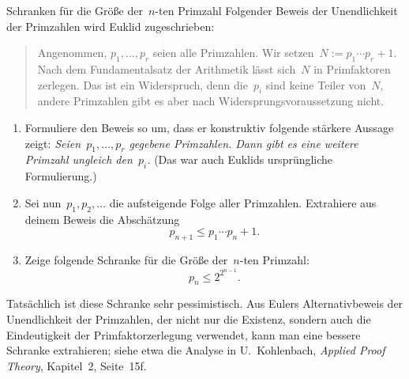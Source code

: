 \documentclass{pizzablatt}
\begin{document}

\begin{aufgabe}{Schranken für die Größe der~$n$-ten Primzahl}
Folgender Beweis der Unendlichkeit der Primzahlen wird Euklid zugeschrieben:

\begin{quote}
Angenommen, $p_1, \ldots, p_r$ seien alle Primzahlen. Wir setzen~$N :=
p_1 \cdots p_r + 1$. Nach dem Fundamentalsatz der Arithmetik lässt sich~$N$ in
Primfaktoren zerlegen. Das ist ein Widerspruch, denn die~$p_i$ sind keine
Teiler von~$N$, andere Primzahlen gibt es aber nach Widersprungsvoraussetzung
nicht.
\end{quote}

\begin{enumerate}
\item Formuliere den Beweis so um, dass er konstruktiv folgende stärkere
Aussage zeigt: \emph{Seien~$p_1,\ldots,p_r$ gegebene Primzahlen. Dann gibt es eine
weitere Primzahl ungleich den~$p_i$.} (Das war auch Euklids ursprüngliche
Formulierung.)

\item Sei nun~$p_1,p_2,\ldots$ die aufsteigende Folge aller Primzahlen. Extrahiere
aus deinem Beweis die Abschätzung
\[ p_{n+1} \leq p_1 \cdots p_n + 1. \]

\item Zeige folgende Schranke für die Größe der~$n$-ten Primzahl:
\[ p_n \leq 2^{2^{n-1}}. \]
\end{enumerate}

Tatsächlich ist diese Schranke sehr pessimistisch. Aus Eulers
Alternativbeweis der Unendlichkeit der Primzahlen, der nicht nur die Existenz,
sondern auch die Eindeutigkeit der
Primfaktorzerlegung verwendet, kann man eine bessere Schranke extrahieren;
siehe etwa die Analyse in U.~Kohlenbach, \emph{Applied Proof Theory}, Kapitel~2,
Seite~15f.
\end{aufgabe}
\end{document}
